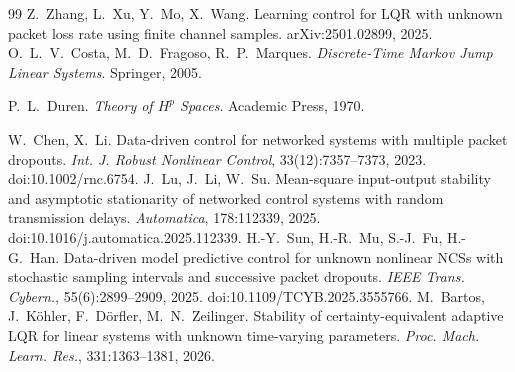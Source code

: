 \documentclass[preprint,12pt,numbers]{elsarticle}
\theoremstyle{definition}
\begin{document}
\begin{thebibliography}{99}
 Z.~Zhang, L.~Xu, Y.~Mo, X.~Wang. Learning control for LQR with unknown packet loss rate using finite channel samples. arXiv:2501.02899, 2025.
 O.~L.~V.~Costa, M.~D.~Fragoso, R.~P.~Marques. \emph{Discrete-Time Markov Jump Linear Systems}. Springer, 2005.

 P.~L.~Duren. \emph{Theory of $H^p$ Spaces}. Academic Press, 1970.

 W.~Chen, X.~Li. Data-driven control for networked systems with multiple packet dropouts. \emph{Int. J. Robust Nonlinear Control}, 33(12):7357--7373, 2023. doi:10.1002/rnc.6754.
 J.~Lu, J.~Li, W.~Su. Mean-square input-output stability and asymptotic stationarity of networked control systems with random transmission delays. \emph{Automatica}, 178:112339, 2025. doi:10.1016/j.automatica.2025.112339.
 H.-Y.~Sun, H.-R.~Mu, S.-J.~Fu, H.-G.~Han. Data-driven model predictive control for unknown nonlinear NCSs with stochastic sampling intervals and successive packet dropouts. \emph{IEEE Trans. Cybern.}, 55(6):2899--2909, 2025. doi:10.1109/TCYB.2025.3555766.
 M.~Bartos, J.~K\"ohler, F.~D\"orfler, M.~N.~Zeilinger. Stability of certainty-equivalent adaptive LQR for linear systems with unknown time-varying parameters. \emph{Proc. Mach. Learn. Res.}, 331:1363--1381, 2026.
\end{thebibliography}\endgroup
\end{document}

